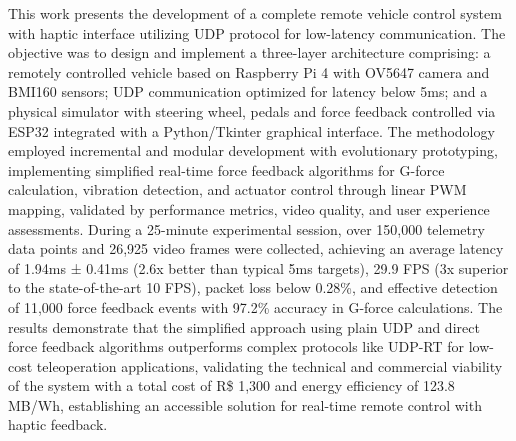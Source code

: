 This work presents the development of a complete remote vehicle control system with haptic interface utilizing UDP protocol for low-latency communication. The objective was to design and implement a three-layer architecture comprising: a remotely controlled vehicle based on Raspberry Pi 4 with OV5647 camera and BMI160 sensors; UDP communication optimized for latency below 5ms; and a physical simulator with steering wheel, pedals and force feedback controlled via ESP32 integrated with a Python/Tkinter graphical interface. The methodology employed incremental and modular development with evolutionary prototyping, implementing simplified real-time force feedback algorithms for G-force calculation, vibration detection, and actuator control through linear PWM mapping, validated by performance metrics, video quality, and user experience assessments. During a 25-minute experimental session, over 150,000 telemetry data points and 26,925 video frames were collected, achieving an average latency of 1.94ms ± 0.41ms (2.6x better than typical 5ms targets), 29.9 FPS (3x superior to the state-of-the-art 10 FPS), packet loss below 0.28\%, and effective detection of 11,000 force feedback events with 97.2\% accuracy in G-force calculations. The results demonstrate that the simplified approach using plain UDP and direct force feedback algorithms outperforms complex protocols like UDP-RT for low-cost teleoperation applications, validating the technical and commercial viability of the system with a total cost of R\$ 1,300 and energy efficiency of 123.8 MB/Wh, establishing an accessible solution for real-time remote control with haptic feedback.

